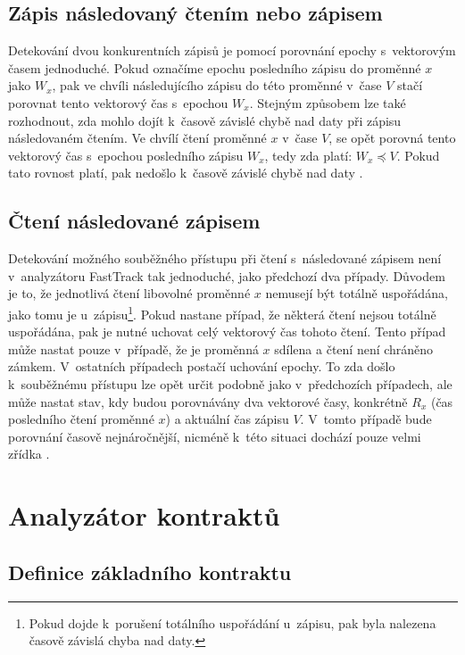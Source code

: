 \subsection{Zápis následovaný čtením nebo zápisem}

Detekování dvou konkurentních zápisů je pomocí porovnání epochy s~vektorovým časem jednoduché. Pokud označíme epochu posledního zápisu do proměnné $x$ jako $W_x$, pak ve chvíli následujícího zápisu do této proměnné v~čase $V$ stačí porovnat tento vektorový čas s~epochou $W_x$. Stejným způsobem lze také rozhodnout, zda mohlo dojít k~časově závislé chybě nad daty při zápisu následovaném čtením. Ve chvílí čtení proměnné $x$ v~čase $V$, se opět porovná tento vektorový čas s~epochou posledního zápisu $W_x$, tedy zda platí: $W_x \preceq V$. Pokud tato rovnost platí, pak nedošlo k~časově závislé chybě nad daty \cite{cite:ft}.

\subsection{Čtení následované zápisem}

Detekování možného souběžného přístupu při čtení s~následované zápisem není v~analyzátoru FastTrack tak jednoduché, jako předchozí dva případy. Důvodem je to, že jednotlivá čtení libovolné proměnné $x$ nemusejí být totálně uspořádána, jako tomu je u~zápisu\footnote{Pokud dojde k~porušení totálního uspořádání u~zápisu, pak byla nalezena časově závislá chyba nad daty.}. Pokud nastane případ, že některá čtení nejsou totálně uspořádána, pak je nutné uchovat celý vektorový čas tohoto čtení. Tento případ může nastat pouze v~případě, že je proměnná $x$ sdílena a čtení není chráněno zámkem. V~ostatních případech postačí uchování epochy. To zda došlo k~souběžnému přístupu lze opět určit podobně jako v~předchozích případech, ale může nastat stav, kdy budou porovnávány dva vektorové časy, konkrétně $R_x$ (čas posledního čtení proměnné $x$) a aktuální čas zápisu $V$. V~tomto případě bude porovnání časově nejnáročnější, nicméně k~této situaci dochází pouze velmi zřídka \cite{cite:ft}.

\section{Analyzátor kontraktů}\label{contract-all}

\subsection{Definice základního kontraktu}\label{contract-basic}

